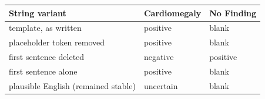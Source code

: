 \begin{tabular}{lll}
\toprule
String variant & Cardiomegaly & No Finding \\
\midrule
template, as written & positive & blank \\
placeholder token removed & positive & blank \\
first sentence deleted & negative & positive \\
first sentence alone & positive & blank \\
plausible English (remained stable) & uncertain & blank \\
\bottomrule
\end{tabular}
